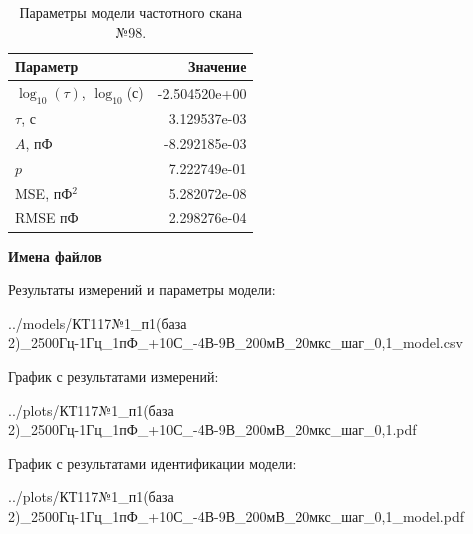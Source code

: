\begin{table}[!ht]
    \centering
    \caption{Параметры модели частотного скана №98.}
    \begin{tabular}{|l|r|}
        \hline
        Параметр                                       & Значение                  \\ \hline
        $\log_{10}(\tau)$, $\log_{10}$(с)              & -2.504520e+00             \\ \hline
        $\tau$, с                                      & 3.129537e-03              \\ \hline
        $A$, пФ                                        & -8.292185e-03             \\ \hline
        $p$                                            & 7.222749e-01              \\ \hline
        MSE, пФ$^2$                                    & 5.282072e-08              \\ \hline
        RMSE пФ                                        & 2.298276e-04              \\ \hline
    \end{tabular}
    \label{table:frequency_scan_model_98}
\end{table}

\textbf{Имена файлов}

Результаты измерений и параметры модели:

\scriptsize../models/КТ117№1\_п1(база 2)\_2500Гц-1Гц\_1пФ\_+10С\_-4В-9В\_200мВ\_20мкс\_шаг\_0,1\_model.csv
\normalsize

График с результатами измерений:

\scriptsize../plots/КТ117№1\_п1(база 2)\_2500Гц-1Гц\_1пФ\_+10С\_-4В-9В\_200мВ\_20мкс\_шаг\_0,1.pdf
\normalsize

График с результатами идентификации модели:

\scriptsize../plots/КТ117№1\_п1(база 2)\_2500Гц-1Гц\_1пФ\_+10С\_-4В-9В\_200мВ\_20мкс\_шаг\_0,1\_model.pdf
\normalsize

